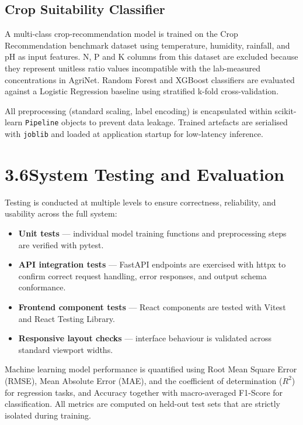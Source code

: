 \documentclass[12pt,a4paper]{article}
\begin{document}
\subsection*{Crop Suitability Classifier}

A multi-class crop-recommendation model is trained on the Crop Recommendation
benchmark dataset using temperature, humidity, rainfall, and pH as input
features.  N, P and K columns from this dataset are excluded because they
represent unitless ratio values incompatible with the lab-measured
concentrations in AgriNet.  Random Forest and XGBoost classifiers are
evaluated against a Logistic Regression baseline using stratified k-fold
cross-validation.

All preprocessing (standard scaling, label encoding) is encapsulated within
scikit-learn \texttt{Pipeline} objects to prevent data leakage.  Trained
artefacts are serialised with \texttt{joblib} and loaded at application startup
for low-latency inference.

\section{3.6\quad System Testing and Evaluation}

Testing is conducted at multiple levels to ensure correctness, reliability,
and usability across the full system:

\begin{itemize}
  \item \textbf{Unit tests} --- individual model training functions and
        preprocessing steps are verified with pytest.
  \item \textbf{API integration tests} --- FastAPI endpoints are exercised with
        httpx to confirm correct request handling, error responses, and output
        schema conformance.
  \item \textbf{Frontend component tests} --- React components are tested with
        Vitest and React Testing Library.
  \item \textbf{Responsive layout checks} --- interface behaviour is validated
        across standard viewport widths.
\end{itemize}

Machine learning model performance is quantified using Root Mean Square Error
(RMSE), Mean Absolute Error (MAE), and the coefficient of determination
($R^{2}$) for regression tasks, and Accuracy together with macro-averaged
F1-Score for classification.  All metrics are computed on held-out test sets
that are strictly isolated during training.
\end{document}
